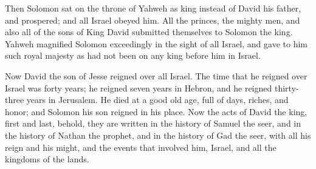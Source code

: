  Then Solomon sat on the throne of Yahweh as king instead
of David his father, and prospered; and all Israel obeyed him.
 All the princes, the mighty men, and also all of the
sons of King David submitted themselves to Solomon the king.
 Yahweh magnified Solomon exceedingly in the sight of all
Israel, and gave to him such royal majesty as had not been on any king
before him in Israel.

 Now David the son of Jesse reigned over all Israel.
 The time that he reigned over Israel was forty years; he
reigned seven years in Hebron, and he reigned thirty-three years in
Jerusalem.  He died at a good old age, full of days,
riches, and honor; and Solomon his son reigned in his place.
 Now the acts of David the king, first and last, behold,
they are written in the history of Samuel the seer, and in the history
of Nathan the prophet, and in the history of Gad the seer,
 with all his reign and his might, and the events that
involved him, Israel, and all the kingdoms of the lands.
